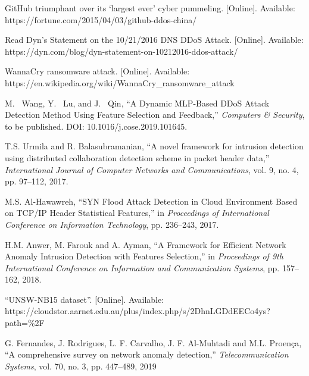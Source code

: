 \documentclass{ieeeaccess}
\theoremstyle{definition}
\begin{document}
% 
\begin{thebibliography}{00}
    GitHub triumphant over its ‘largest ever’ cyber pummeling. [Online]. Available: \\ https://fortune.com/2015/04/03/github-ddos-china/

    Read Dyn’s Statement on the 10/21/2016 DNS DDoS Attack. [Online]. Available: \\ https://dyn.com/blog/dyn-statement-on-10212016-ddos-attack/

    WannaCry ransomware attack. [Online]. Available: \\ https://en.wikipedia.org/wiki/WannaCry\_ransomware\_attack

    M. ~Wang, Y. ~Lu, and J. ~Qin, ``A Dynamic MLP-Based DDoS Attack Detection Method Using Feature Selection and Feedback,'' \emph{Computers \& Security}, to be published. DOI: 10.1016/j.cose.2019.101645.

    T.S. Urmila and R. Balasubramanian, ``A novel framework for intrusion detection using distributed collaboration detection scheme in packet header data,'' \emph{International Journal of Computer Networks and Communications}, vol. 9, no. 4, pp. 97--112, 2017.

    M.S. Al-Hawawreh, ``SYN Flood Attack Detection in Cloud Environment Based on TCP/IP Header Statistical Features,'' in \emph{Proceedings of International Conference on Information Technology}, pp. 236--243, 2017.

    H.M. Anwer, M. Farouk and A. Ayman, ``A Framework for Efficient Network Anomaly Intrusion Detection with Features Selection,'' in \emph{Proceedings of 9th International Conference on Information and Communication Systems}, pp. 157--162, 2018.

    ``UNSW-NB15 dataset''. [Online]. Available: \\https://cloudstor.aarnet.edu.au/plus/index.php/s/2DhnLGDdEECo4ys?path=\%2F

    G. Fernandes, J. Rodrigues, L. F. Carvalho, J. F. Al-Muhtadi and M.L. Proença, ``A comprehensive survey on network anomaly detection,'' \emph{Telecommunication Systems}, vol. 70, no. 3, pp. 447--489, 2019


\end{thebibliography}
\end{document}
